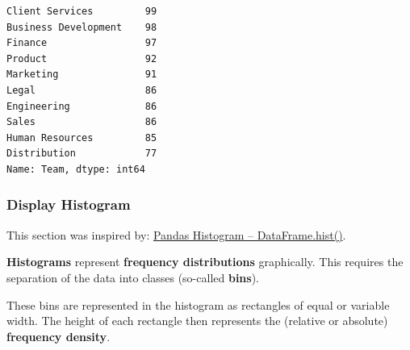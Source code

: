 \documentclass [oneside,10pt,a4paper,ngerman,BCOR10mm,headsepline,parindent,final]{scrartcl}
\makeatletter
\newcommand{\boxspacing}{\kern\kvtcb@left@rule\kern\kvtcb@boxsep}
\newcommand{\prompt}[4]{
        {\ttfamily\llap{{\color{#2}[#3]:\hspace{3pt}#4}}\vspace{-\baselineskip}}
    }
\makeatother
\begin{document}
            \begin{tcolorbox}[breakable, size=fbox, boxrule=.5pt, pad at break*=1mm, opacityfill=0]
\prompt{Out}{outcolor}{53}{\boxspacing}
\begin{Verbatim}[commandchars=\\\{\}]
Client Services         99
Business Development    98
Finance                 97
Product                 92
Marketing               91
Legal                   86
Engineering             86
Sales                   86
Human Resources         85
Distribution            77
Name: Team, dtype: int64
\end{Verbatim}
\end{tcolorbox}
        
    \hypertarget{display-histogram}{%
\subsubsection{Display Histogram}\label{display-histogram}}

This section was inspired by:
\href{https://dataindependent.com/pandas/pandas-histogram-dataframe-hist/}{Pandas
Histogram -- DataFrame.hist()}.

\textbf{Histograms} represent \textbf{frequency distributions}
graphically. This requires the separation of the data into classes
(so-called \textbf{bins}).

These bins are represented in the histogram as rectangles of equal or
variable width. The height of each rectangle then represents the
(relative or absolute) \textbf{frequency density}.
\end{document}
